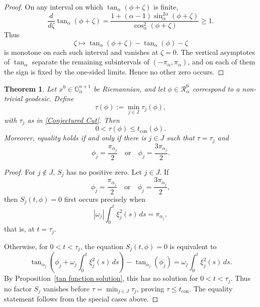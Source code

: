 \documentclass[12pt]{amsart}
\numberwithin{equation}{section}
\theoremstyle{plain}
\newtheorem{theorem}{Theorem}[section]
\theoremstyle{definition}
\theoremstyle{remark}
\begin{document}
\begin{proof}
    On any interval on which \(\tan_\alpha(\phi+\zeta)\) is finite,
    \[
        \frac{d}{d\zeta}\tan_\alpha(\phi+\zeta)
        =
        \frac{
            1+(\alpha-1)\sin_\alpha^{2\alpha}(\phi+\zeta)
        }{
            \cos_\alpha^2(\phi+\zeta)
        }
        \geq 1.
    \]
    Thus
    \[
        \zeta\mapsto \tan_\alpha(\phi+\zeta)-\tan_\alpha(\phi)-\zeta
    \]
    is monotone on each such interval and vanishes at \(\zeta=0\). The vertical asymptotes of
    \(\tan_\alpha\) separate the remaining subintervals of \((-\pi_\alpha,\pi_\alpha)\), and on
    each of them the sign is fixed by the one-sided limits. Hence no other zero occurs.
\end{proof}

\begin{theorem}\label{Determinant}
    Let \(x^0\in\mathbb G_\alpha^{n+1}\) be Riemannian, and let
    \(\phi\in\mathcal R_\alpha^0\) correspond to a non-trivial geodesic. Define
    \[
        \tau(\phi):=\min_{j\in J}\tau_j(\phi),
    \]
    with \(\tau_j\) as in \eqref{Conjectured Cut}. Then
    \begin{equation}\label{conjugate inequality}
        0<\tau(\phi)\leq t_{\operatorname{con}}(\phi).
    \end{equation}
    Moreover, equality holds if and only if there is \(j\in J\) such that
    \(\tau=\tau_j\) and
    \[
        \phi_j=\frac{\pi_{\alpha_j}}{2}
        \quad\text{or}\quad
        \phi_j=\frac{3\pi_{\alpha_j}}{2}.
    \]
\end{theorem}

\begin{proof}
    For \(j\notin J\), \(S_j\) has no positive zero. Let \(j\in J\). If
    \[
        \phi_j=\frac{\pi_{\alpha_j}}{2}
        \quad\text{or}\quad
        \phi_j=\frac{3\pi_{\alpha_j}}{2},
    \]
    then \(S_j(t,\phi)=0\) first occurs precisely when
    \[
        |\omega_j|\int_0^t\xi_j^2(s)\,ds=\pi_{\alpha_j},
    \]
    that is, at \(t=\tau_j\).

    Otherwise, for \(0<t<\tau_j\), the equation \(S_j(t,\phi)=0\) is equivalent to
    \[
        \tan_{\alpha_j}
        \left(
        \phi_j+\omega_j\int_0^t\xi_j^2(s)\,ds
        \right)
        -
        \tan_{\alpha_j}(\phi_j)
        =
        \omega_j\int_0^t\xi_j^2(s)\,ds.
    \]
    By Proposition~\ref{tan function solution}, this has no solution for \(0<t<\tau_j\).
    Thus no factor \(S_j\) vanishes before \(\tau=\min_{j\in J}\tau_j\), proving
    \(\tau\leq t_{\operatorname{con}}\). The equality statement follows from the special
    cases above.
\end{proof}
\end{document}
